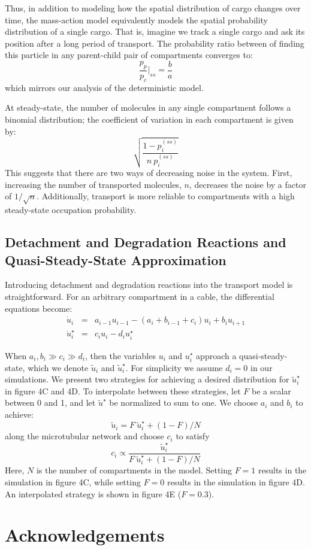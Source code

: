 \documentclass[11pt]{wlpeerj}
\begin{document}
Thus, in addition to modeling how the spatial distribution of cargo changes over time, the mass-action model equivalently models the spatial probability distribution of a single cargo. That is, imagine we track a single cargo and ask its position after a long period of transport. The probability ratio between of finding this particle in any parent-child pair of compartments converges to:
$$
\frac{p_p}{p_c} \bigg|_{ss} = \frac{b}{a}
$$
which mirrors our analysis of the deterministic model.

At steady-state, the number of molecules in any single compartment follows a binomial distribution; the coefficient of variation in each compartment is given by:
$$
\sqrt{\frac{1-p_i^{(ss)}}{n~p_i^{(ss)}}}
$$
This suggests that there are two ways of decreasing noise in the system. First, increasing the number of transported molecules, $n$, decreases the noise by a factor of $1/\sqrt{n}$. Additionally, transport is more reliable to compartments with a high steady-state occupation probability.

\subsection*{Detachment and Degradation Reactions and Quasi-Steady-State Approximation}

Introducing detachment and degradation reactions into the transport model is straightforward. For an arbitrary compartment in a cable, the differential equations become:
$$
\begin{array}{lcl}
\dot{u}_i & = & a_{i-1} u_{i-1} - (a_i+b_{i-1}+c_i) u_i + b_i u_{i+1} \\
\dot{u}_i^\star & = & c_i u_i - d_i u_i^\star
\end{array}
$$

When $a_i,b_i \gg c_i \gg d_i$, then the variables $u_i$ and $u_i^\star$ approach a quasi-steady-state, which we denote $\tilde{u}_i$ and $\tilde{u}_i^\star$. For simplicity we assume $d_i = 0$ in our simulations. We present two strategies for achieving a desired distribution for $\tilde{u}_i^\star$ in figure 4C and 4D. To interpolate between these strategies, let $F$ be a scalar between 0 and 1, and let $\tilde{u}^\star$ be normalized to sum to one. We choose $a_i$ and $b_i$ to achieve:
$$
\tilde{u}_i = F~\tilde{u}_i^\star + (1-F)/N 
$$
along the microtubular network and choose $c_i$ to satisfy
$$
c_i \propto \frac{\tilde{u}_i^\star}{F~\tilde{u}_i^\star + (1-F)/N} 
$$
Here, $N$ is the number of compartments in the model. Setting $F=1$ results in the simulation in figure 4C, while setting $F=0$ results in the simulation in figure 4D. An interpolated strategy is shown in figure 4E ($F=0.3$).

\section*{Acknowledgements}


\end{document}
